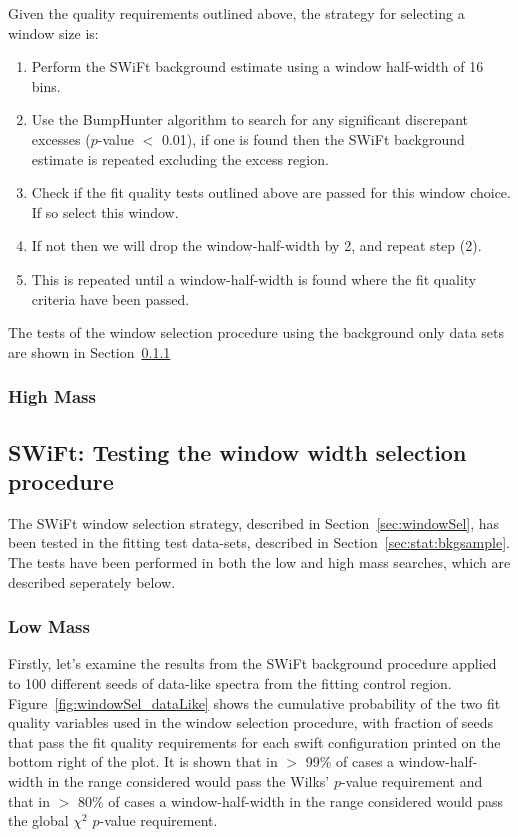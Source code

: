 \noindent
Given the quality requirements outlined above, the strategy for selecting a window size is:
\begin{enumerate}
\item Perform the SWiFt background estimate using a window half-width of 16 bins.
\item Use the {\sc BumpHunter} algorithm to search for any significant discrepant excesses ($p$-value $<$ 0.01),
  if one is found then the SWiFt background estimate is repeated excluding the excess region.
\item Check if the fit quality tests outlined above are passed for this window choice. If so select this window.
\item If not then we will drop the window-half-width by 2, and repeat step (2).
\item This is repeated until a window-half-width is found where the fit quality criteria have been passed.
\end{enumerate}

\noindent
The tests of the window selection procedure using the background only data sets are shown in Section~\ref{sec:lowmass_windowSelTests}

\subsubsection{High Mass} 
\label{sec:highmass_windowSel}

\subsection{SWiFt: Testing the window width selection procedure}

The SWiFt window selection strategy, described in Section~\ref{sec:windowSel}, has been tested in the fitting test data-sets, described in Section~\ref{sec:stat:bkgsample}.
The tests have been performed in both the low and high mass searches, which are described seperately below.

\subsubsection{Low Mass}
\label{sec:lowmass_windowSelTests} 

Firstly, let's examine the results from the SWiFt background procedure applied to 100 different seeds of data-like spectra from the fitting control region.
Figure~\ref{fig:windowSel_dataLike} shows the cumulative probability of the two fit quality variables used in the window selection procedure,
with fraction of seeds that pass the fit quality requirements for each swift configuration printed on the bottom right of the plot.
It is shown that in $>$ 99\% of cases a window-half-width in the range considered would pass the Wilks' $p$-value requirement
and that in $>$ 80\% of cases a window-half-width in the range considered would pass the global $\chi^{2}$ $p$-value requirement.

